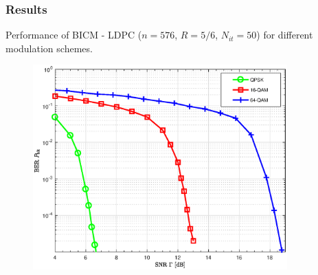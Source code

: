 \documentclass[]{beamer}
\begin{document}
\begin{frame}
\transwipe[direction=0]
\frametitle{Results}
Performance of BICM - LDPC ($n = 576$, $R = 5/6$, $N_{it} = 50$) for different modulation schemes.
\begin{center}
\begin{figure}
\includegraphics[width=9.8cm, trim={0 0 0 0.9cm},clip]{figure1/bicm}
\end{figure}
\end{center}

\end{frame}
\end{document}
